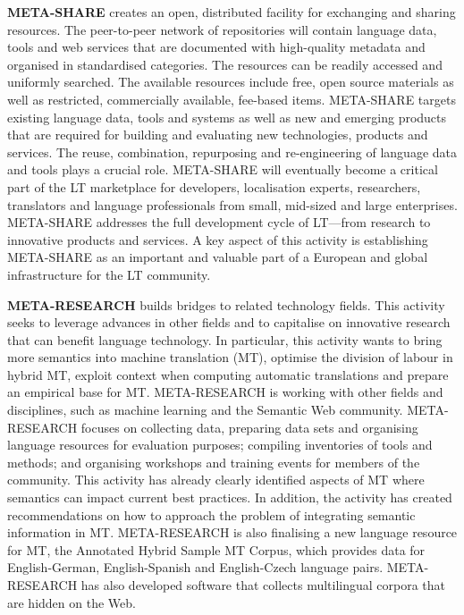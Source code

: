 \documentclass{../../metanetpaper}
\begin{document}
\begin{Parallel}[c]{79mm}{78mm}
{\textbf{META-SHARE} creates an open, distributed facility for
exchanging and sharing resources. The peer-to-peer network of
repositories will contain language data, tools and web services that
are documented with high-quality metadata and organised in
standardised categories. The resources can be readily accessed and
uniformly searched. The available resources include free, open source
materials as well as restricted, commercially available, fee-based
items. META-SHARE targets existing language data, tools and systems as
well as new and emerging products that are required for building and
evaluating new technologies, products and services. The reuse,
combination, repurposing and re-engineering of language data and tools
plays a crucial role. META-SHARE will eventually become a critical
part of the LT marketplace for developers, localisation experts,
researchers, translators and language professionals from small,
mid-sized and large enterprises. META-SHARE addresses the full
development cycle of LT—from research to innovative products and
services. A key aspect of this activity is establishing META-SHARE as
an important and valuable part of a European and global infrastructure
for the LT community.

\textbf{META-RESEARCH} builds bridges to related technology
fields. This activity seeks to leverage advances in other fields and
to capitalise on innovative research that can benefit language
technology. In particular, this activity wants to bring more semantics
into machine translation (MT), optimise the division of labour in
hybrid MT, exploit context when computing automatic translations and
prepare an empirical base for MT. META-RESEARCH is working with other
fields and disciplines, such as machine learning and the Semantic Web
community.  META-RESEARCH focuses on collecting data, preparing data
sets and organising language resources for evaluation purposes;
compiling inventories of tools and methods; and organising workshops
and training events for members of the community. This activity has
already clearly identified aspects of MT where semantics can impact
current best practices. In addition, the activity has created
recommendations on how to approach the problem of integrating semantic
information in MT. META-RESEARCH is also finalising a new language
resource for MT, the Annotated Hybrid Sample MT Corpus, which provides
data for English-German, English-Spanish and English-Czech language
pairs. META-RESEARCH has also developed software that collects
multilingual corpora that are hidden on the Web.
}


\end{Parallel}
\end{document}
